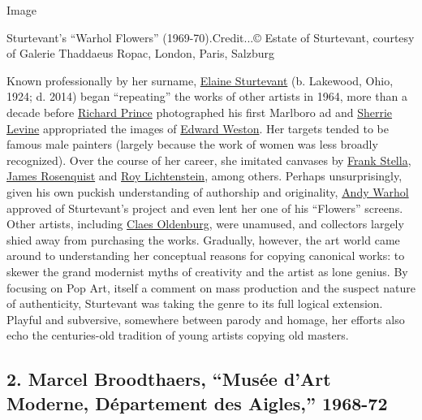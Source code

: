 Image

Sturtevant's ``Warhol Flowers'' (1969-70).Credit...© Estate of
Sturtevant, courtesy of Galerie Thaddaeus Ropac, London, Paris, Salzburg

Known professionally by her surname,
\href{https://www.nytimes.com/2014/05/17/arts/design/elaine-sturtevant-appropriation-artist-is-dead-at-89.html}{Elaine
Sturtevant} (b. Lakewood, Ohio, 1924; d. 2014) began ``repeating'' the
works of other artists in 1964, more than a decade before
\href{https://www.nytimes.com/topic/person/richard-prince}{Richard
Prince} photographed his first Marlboro ad and
\href{https://www.nytimes.com/1987/09/12/arts/original-slant-on-originality.html}{Sherrie
Levine} appropriated the images of
\href{https://www.nytimes.com/topic/person/edward-weston}{Edward
Weston}. Her targets tended to be famous male painters (largely because
the work of women was less broadly recognized). Over the course of her
career, she imitated canvases by
\href{https://www.nytimes.com/2019/02/17/arts/design/frank-stella-black-paintings.html}{Frank
Stella},
\href{https://www.nytimes.com/2017/04/01/arts/james-rosenquist-dead-pop-art.html}{James
Rosenquist} and
\href{https://www.nytimes.com/topic/person/roy-lichtenstein}{Roy
Lichtenstein}, among others. Perhaps unsurprisingly, given his own
puckish understanding of authorship and originality,
\href{https://www.nytimes.com/2018/11/01/arts/design/andy-warhol-inc-how-he-made-business-his-art.html}{Andy
Warhol} approved of Sturtevant's project and even lent her one of his
``Flowers'' screens. Other artists, including
\href{https://www.nytimes.com/2017/10/16/t-magazine/claes-oldenburg.html}{Claes
Oldenburg}, were unamused, and collectors largely shied away from
purchasing the works. Gradually, however, the art world came around to
understanding her conceptual reasons for copying canonical works: to
skewer the grand modernist myths of creativity and the artist as lone
genius. By focusing on Pop Art, itself a comment on mass production and
the suspect nature of authenticity, Sturtevant was taking the genre to
its full logical extension. Playful and subversive, somewhere between
parody and homage, her efforts also echo the centuries-old tradition of
young artists copying old masters.

\hypertarget{2-marcel-broodthaers-musuxe9e-dart-moderne-duxe9partement-des-aigles-1968-72}{%
\subsection{2. Marcel Broodthaers, ``Musée d'Art Moderne, Département
des Aigles,''
1968-72}\label{2-marcel-broodthaers-musuxe9e-dart-moderne-duxe9partement-des-aigles-1968-72}}

